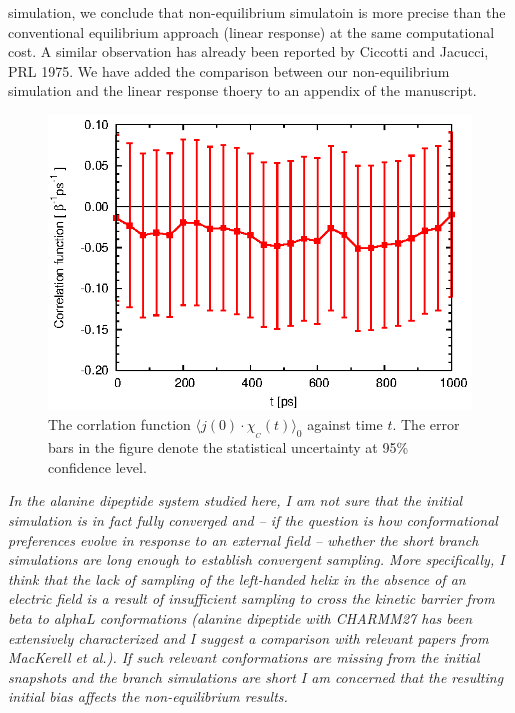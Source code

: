 \documentclass[]{revtex4-1}
\begin{document}
simulation, we conclude that non-equilibrium simulatoin is more
precise than the conventional equilibrium approach (linear response) at the same computational cost.
A similar
observation has already been reported by Ciccotti and Jacucci, PRL
1975. We have added the comparison between our non-equilibrium
simulation and the linear response thoery to an appendix of the manuscript.
\\


\begin{figure}
  \centering
  \includegraphics{figs/fig-corr-meta.eps}
  \caption{The corrlation function $\langle j(0)\cdot \chi_{_C}(t)
    \rangle_0$ against time $t$. The error bars in the figure denote
    the statistical uncertainty at 95\% confidence level. }
  \label{fig:tmp1}
\end{figure}


\emph{
In the alanine dipeptide system studied here, I am not sure that the
initial simulation is in fact fully converged and -- if the question is
how conformational preferences evolve in response to an external field
-- whether the short branch simulations are long enough to establish
convergent sampling. More specifically, I think that the lack of
sampling of the left-handed helix in the absence of an electric field
is a result of insufficient sampling to cross the kinetic barrier from
beta to alphaL conformations (alanine dipeptide with CHARMM27 has been
extensively characterized and I suggest a comparison with relevant
papers from MacKerell et al.). If such relevant conformations are
missing from the initial snapshots and the branch simulations are
short I am concerned that the resulting initial bias affects the
non-equilibrium results.
}\\
\end{document}
